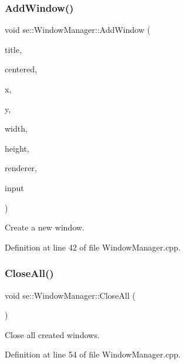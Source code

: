 \subsubsection{\texorpdfstring{Add\+Window()}{AddWindow()}\hspace{0.1cm}{\footnotesize\ttfamily [2/2]}}
{\footnotesize\ttfamily void se\+::\+Window\+Manager\+::\+Add\+Window (\begin{DoxyParamCaption}\item[{const std\+::string \&}]{title,  }\item[{bool}]{centered,  }\item[{int}]{x,  }\item[{int}]{y,  }\item[{int}]{width,  }\item[{int}]{height,  }\item[{\mbox{\hyperlink{classse_1_1_abstract_renderer}{Abstract\+Renderer}} $\ast$}]{renderer,  }\item[{\mbox{\hyperlink{classse_1_1_abstract_input}{Abstract\+Input}} $\ast$}]{input }\end{DoxyParamCaption})}

Create a new window. 

Definition at line 42 of file Window\+Manager.\+cpp.

\mbox{\label{classse_1_1_window_manager_ae9106e9a62fa38456da31055f3a663ea}} 
\subsubsection{\texorpdfstring{Close\+All()}{CloseAll()}}
{\footnotesize\ttfamily void se\+::\+Window\+Manager\+::\+Close\+All (\begin{DoxyParamCaption}{ }\end{DoxyParamCaption})}

Close all created windows. 

Definition at line 54 of file Window\+Manager.\+cpp.

\mbox{\label{classse_1_1_window_manager_ac3c111c7a70c25d2f49b4f6573e87a48}} 

